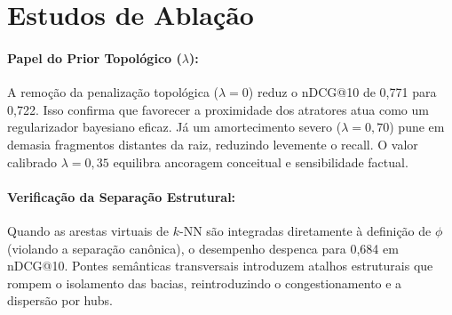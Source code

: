 \documentclass[10pt,twocolumn]{article}
\theoremstyle{definition}
\begin{document}
\section{Estudos de Ablação}

\begin{table}[t]
\centering
\caption{Análise de ablação no BEIR SciFact ($N=50$ consultas).}
\label{tab:ablations_pt}
\end{table}

\paragraph{Papel do Prior Topológico ($\lambda$):}
A remoção da penalização topológica ($\lambda = 0$) reduz o nDCG@10 de 0,771 para 0,722. Isso confirma que favorecer a proximidade dos atratores atua como um regularizador bayesiano eficaz. Já um amortecimento severo ($\lambda = 0,70$) pune em demasia fragmentos distantes da raiz, reduzindo levemente o recall. O valor calibrado $\lambda = 0,35$ equilibra ancoragem conceitual e sensibilidade factual.

\paragraph{Verificação da Separação Estrutural:}
Quando as arestas virtuais de $k$-NN são integradas diretamente à definição de $\phi$ (violando a separação canônica), o desempenho despenca para 0,684 em nDCG@10. Pontes semânticas transversais introduzem atalhos estruturais que rompem o isolamento das bacias, reintroduzindo o congestionamento e a dispersão por hubs.
\end{document}
